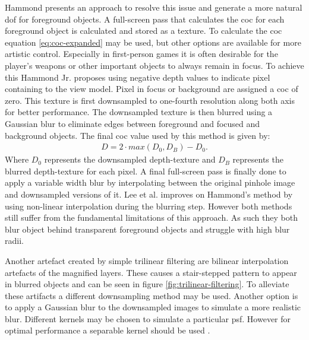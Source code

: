 Hammond \cite{Hammon.2008} presents an approach to resolve this issue and generate a more natural \gls{dof} for foreground objects.
A full-screen pass that calculates the \gls{coc} for each foreground object is calculated and stored as a texture.
To calculate the \gls{coc} equation \ref{eq:coc-expanded} may be used, but other options are available for more artistic control.
Especially in first-person games it is often desirable for the player's weapons or other important objects to always remain in focus.
To achieve this Hammond Jr. proposes using negative depth values to indicate pixel containing to the view model.
Pixel in focus or background are assigned a \gls{coc} of zero.
This texture is first downsampled to one-fourth resolution along both axis for better performance.
The downsampled texture is then blurred using a Gaussian blur to eliminate edges between foreground and focused and background objects.
The final \gls{coc} value used by this method is given by:
\begin{align}
    D = 2 \cdot max(D_0, D_B) - D_0.
\end{align}
Where $D_0$ represents the downsampled depth-texture and $D_B$ represents the blurred depth-texture for each pixel.
A final full-screen pass is finally done to apply a variable width blur by interpolating between the original pinhole image and downsampled versions of it.
Lee et al. \cite{Lee.2009} improves on Hammond's method by using non-linear interpolation during the blurring step.
However both methods still suffer from the fundamental limitations of this approach.
As such they both blur object behind transparent foreground objects and struggle with high blur radii.

Another artefact created by simple trilinear filtering are bilinear interpolation artefacts of the magnified layers.
These causes a stair-stepped pattern to appear in blurred objects and can be seen in figure \ref{fig:trilinear-filtering}.
To alleviate these artifacts a different downsampling method may be used.
Another option is to apply a Gaussian blur to the downsampled images to simulate a more realistic blur.
Different kernels may be chosen to simulate a particular \gls{psf}.
However for optimal performance a separable kernel should be used \cite{Demers.2005, Gilham.2007}.


